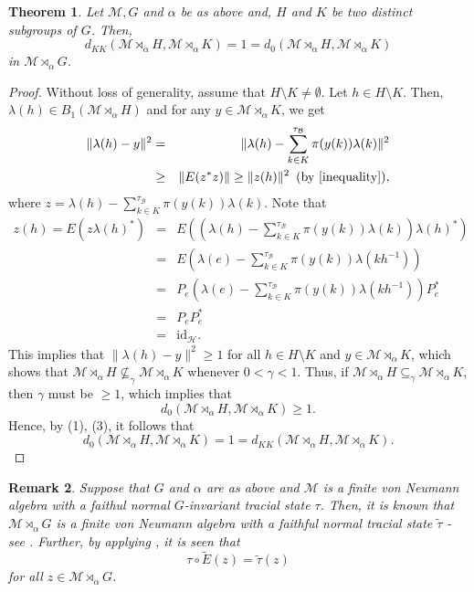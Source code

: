 \documentclass{amsart}
\numberwithin{equation}{section}
\newcommand{\mcal}{\mathcal}
\newcommand{\1}{\mathbf{1}}
\newtheorem{theorem}{Theorem}[section]
\newtheorem{remark}[theorem]{Remark}
\begin{document}
\begin{theorem}
Let $\mcal{M}, G$ and $\alpha$ be as above and, $H$ and $ K$ be two
distinct subgroups of $G$. Then,
\[
d_{KK}(\mcal{M} \rtimes_{\alpha}H, \mcal{M} \rtimes_{\alpha}K)=1=
d_{0}(\mcal{M} \rtimes_{\alpha}H, \mcal{M} \rtimes_{\alpha}K)
\]
in $\mcal{M} \rtimes_{\alpha}G$.
\end{theorem}

\begin{proof}
Without loss of generality, assume that $H\setminus K \neq
\emptyset$. Let $h\in H \setminus K$. Then, $\lambda(h)\in
B_1(\mcal{M} \rtimes_{\alpha}H)$ and for any $y\in \mcal{M}
\rtimes_{\alpha}K$, we get
\begin{eqnarray*}
\|\lambda(h)-y\|^2&=& \|\lambda(h)- \sum^{\tau_{\mcal{B}}}_{k\in
  K}\pi(y(k))\lambda(k)\|^2 \\ &\geq&\| E(z^*z)\| \geq \|z(h)\|^2
\,\,\,\text{(by \Cref{inequality})},
\end{eqnarray*}
where $z= \lambda(h)- \sum^{\tau_{\mcal{B}}}_{k\in K}\pi(y(k))\lambda(k)$. Note that
\begin{eqnarray*}
z(h)= E(z\lambda(h)^*)&=& E((\lambda(h)- \sum^{\tau_{\mcal{B}}}_{k\in K}\pi(y(k))\lambda(k))\lambda(h)^*)\\
&=& E(\lambda(e)- \sum^{\tau_{\mcal{B}}}_{k\in K}\pi(y(k))\lambda(kh^{-1}))\\
&=& P_e(\lambda(e)- \sum^{\tau_{\mcal{B}}}_{k\in K}\pi(y(k))\lambda(kh^{-1}))P^{*}_e\\
&=& P_eP^{*}_e\\
& = & \mathrm{id}_{\mcal{H}}. 
\end{eqnarray*}
This implies that $\|\lambda(h)-y\|^2\geq 1$ for all $h \in H \setminus K$ and $y \in \mcal{M}\rtimes_{\alpha} K$, which shows that $\mcal{M}
\rtimes_{\alpha}H \nsubseteq_{\gamma} \mcal{M} \rtimes_{\alpha}K$ whenever $0 < \gamma < 1$. Thus, if  $\mcal{M}
\rtimes_{\alpha}H \subseteq_{\gamma} \mcal{M} \rtimes_{\alpha}K$, then 
$\gamma$ must be $ \geq 1$, which implies that 
 \[
 d_{0}(\mcal{M} \rtimes_{\alpha}H, \mcal{M} \rtimes_{\alpha}K)\geq 1.
 \]
Hence, by (1), (3), it follows that
\[
d_{0}(\mcal{M} \rtimes_{\alpha}H, \mcal{M}
\rtimes_{\alpha}K)=1=d_{KK}(\mcal{M} \rtimes_{\alpha}H, \mcal{M}
\rtimes_{\alpha}K).
\]

\end{proof}

\begin{remark}\label{invariance}
Suppose that $ G$ and $ \alpha$ are as above and $\mcal{M}$ is a
finite von Neumann algebra with a faithul normal $G$-invariant tracial
state $\tau$. Then, it is known that $\mcal{M} \rtimes_{\alpha}G$ is a
finite von Neumann algebra with a faithful normal tracial state
$\tilde{\tau}$ - see \cite[Proposition 1.3.2]{JS}.  Further, by applying
, it is seen that
$$\tau \circ
\tilde{E}(z)= \tilde{\tau}(z)
$$ 
for all $z\in \mcal{M} \rtimes_{\alpha}G$.
\end{remark}
\end{document}
